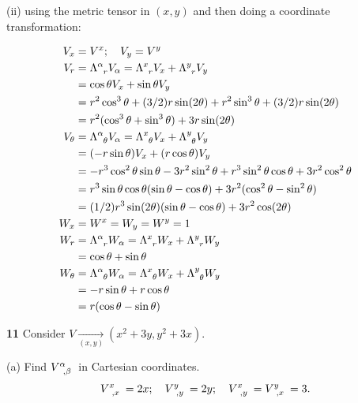 \documentclass[gr-notes.tex]{subfiles}
\begin{document}
(ii)
using the metric tensor in $(x,y)$ and then doing a coordinate transformation:

\begin{align*}
  V_x &= V^x; \quad V_y = V^y
  \\
  V_r &=
  \tensor{\Lambda}{^\alpha_r} V_\alpha =
  \tensor{\Lambda}{^x_r} V_x + \tensor{\Lambda}{^y_r} V_y
  \\ &=
  \cos\theta V_x + \sin\theta V_y
  \\ &=
  r^2 \cos^3\theta + (3/2) r \sin(2\theta) +
  r^2 \sin^3\theta + (3/2) r \sin(2\theta)
  \\ &=
  r^2 (\cos^3\theta + \sin^3\theta) + 3 r \sin(2\theta)
  \\
  V_\theta &=
  \tensor{\Lambda}{^\alpha_\theta} V_\alpha =
  \tensor{\Lambda}{^x_\theta} V_x + \tensor{\Lambda}{^y_\theta} V_y
  \\ &=
  (-r \sin\theta) V_x + (r \cos\theta) V_y
  \\ &=
  -r^3 \cos^2\theta \sin\theta - 3 r^2 \sin^2\theta +
   r^3 \sin^2\theta \cos\theta + 3 r^2 \cos^2\theta
  \\ &=
  r^3 \sin\theta \cos\theta (\sin\theta - \cos\theta) +
  3 r^2 (\cos^2\theta - \sin^2\theta)
  \\ &=
  (1/2) r^3 \sin(2\theta) (\sin\theta - \cos\theta) +
  3 r^2 \cos(2\theta)
  \\
  W_x &= W^x = W_y = W^y = 1
  \\
  W_r &=
  \tensor{\Lambda}{^\alpha_r} W_\alpha =
  \tensor{\Lambda}{^x_r} W_x + \tensor{\Lambda}{^y_r} W_y
  \\ &=
  \cos\theta + \sin\theta
  \\
  W_\theta &=
  \tensor{\Lambda}{^\alpha_\theta} W_\alpha =
  \tensor{\Lambda}{^x_\theta} W_x + \tensor{\Lambda}{^y_\theta} W_y
  \\ &=
  -r \sin\theta + r \cos\theta
  \\ &=
  r (\cos\theta - \sin\theta)
\end{align*}


\textbf{11}
Consider $V \underset{(x,y)}{\to} (x^2 + 3y, y^2 + 3x)$.

(a)
Find $\tensor{V}{^\alpha_{,\beta}}$ in Cartesian coordinates.
%
\begin{displaymath}
  \tensor{V}{^x_{,x}} = 2 x; \quad
  \tensor{V}{^y_{,y}} = 2 y; \quad
  \tensor{V}{^x_{,y}} = \tensor{V}{^y_{,x}} = 3.
\end{displaymath}
\end{document}
